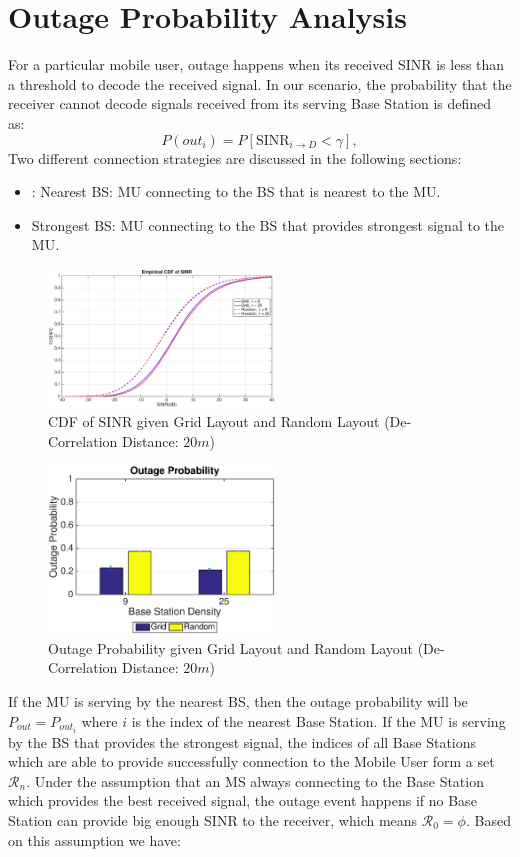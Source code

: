 \documentclass[journal,comsoc]{IEEEtran}
\begin{document}
\section{Outage Probability Analysis}
\label{OutageProb}
\par For a particular mobile user, outage happens when its received SINR is less than a threshold to decode the received signal. In our scenario, the probability that the receiver cannot decode signals received from its serving Base Station is defined as:
\begin{equation}
P(out_{i}) = P[\text{SINR}_{i\to D} < \gamma],
\end{equation}
Two different connection strategies are discussed in the following sections:
\begin{itemize}
\item: Nearest BS: MU connecting to the BS that is nearest to the MU.
\item Strongest BS: MU connecting to the BS that provides strongest signal to the MU.
\end{itemize}
\begin{figure}
\centering
\includegraphics[width=6cm]{GridVSRandom.eps}
\caption{CDF of SINR given Grid Layout and Random Layout (De-Correlation Distance: $20m$)}
\label{cdf1}
\end{figure}
\begin{figure}
\centering
\includegraphics[width=6cm]{OutageProbGridVSRandom.eps}
\caption{Outage Probability given Grid Layout and Random Layout (De-Correlation Distance: $20m$)}
\label{outage1}
\end{figure}
If the MU is serving by the nearest BS, then the outage probability will be $P_{out} = P_{out_{i}}$ where $i$ is the index of the nearest Base Station. If the MU is serving by the BS that provides the strongest signal, the indices of all Base Stations which are able to provide successfully connection to the Mobile User form a set $\mathcal{R}_{n}$. Under the assumption that an MS always connecting to the Base Station which provides the best received signal, the outage event happens if no Base Station can provide big enough SINR to the receiver, which means $\mathcal{R}_{0}=\phi$. Based on this assumption we have:
\end{document}

